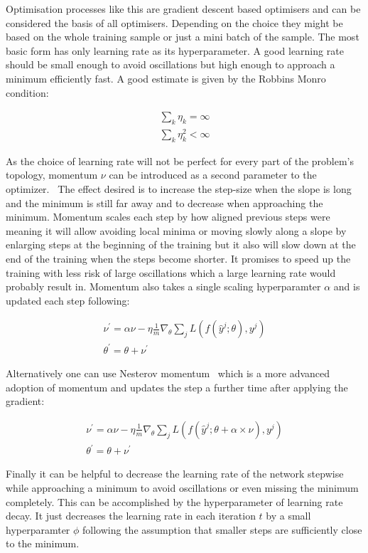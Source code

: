 Optimisation processes like this are gradient descent based optimisers and can be considered the basis of all optimisers. Depending on the choice they might be based on the whole training sample or just a mini batch of the sample. The most basic form has only learning rate as its hyperparameter. A good learning rate should be small enough to avoid oscillations but high enough to approach a minimum efficiently fast. A good estimate is given by the Robbins Monro condition:

\begin{align}
    \sum_k \eta_k = \infty\\
    \sum_k \eta_k^2 < \infty
\end{align}

As the choice of learning rate will not be perfect for every part of the problem's topology, momentum $\nu$ can be introduced as a second parameter to the optimizer.~\cite{chollet2015keras} The effect desired is to increase the step-size when the slope is long and the minimum is still far away and to decrease when approaching the minimum. Momentum scales each step by how aligned previous steps were meaning it will allow avoiding local minima or moving slowly along a slope by enlarging steps at the beginning of the training but it also will slow down at the end of the training when the steps become shorter. It promises to speed up the training with less risk of large oscillations which a large learning rate would probably result in. Momentum also takes a single scaling hyperparamter $\alpha$ and is updated each step following: 

\begin{align}
    \nu^{\prime} = \alpha \nu - \eta \frac{1}{m} \nabla_{\theta} \sum_j L(f(\hat{y}^j; \theta), y^j)\\
    \theta^{\prime} = \theta + \nu^{\prime}
\end{align}

Alternatively one can use Nesterov momentum~\cite{chollet2015keras} which is a more advanced adoption of momentum and updates the step a further time after applying the gradient: 

\begin{align}
    \nu^{\prime} = \alpha \nu - \eta \frac{1}{m} \nabla_{\theta} \sum_j L(f(\hat{y}^j; \theta + \alpha \times \nu), y^j)\\
    \theta^{\prime} = \theta + \nu^{\prime}
\end{align}

Finally it can be helpful to decrease the learning rate of the network stepwise while approaching a minimum to avoid oscillations or even missing the minimum completely. This can be accomplished by the hyperparameter of learning rate decay. It just decreases the learning rate in each iteration $t$ by a small hyperparamter $\phi$ following the assumption that smaller steps are sufficiently close to the minimum.~\cite{chollet2015keras}

